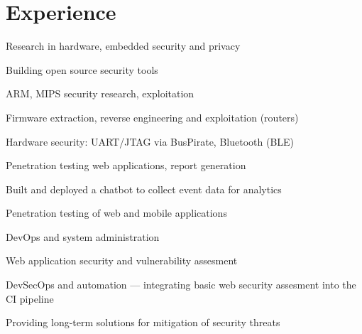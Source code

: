 \documentclass[]{resume-openfont}
\begin{document}
\hfill
\begin{minipage}[t]{0.66\textwidth} 


\section{Experience}
\vspace{\topsep} %
\begin{tightemize}
\item Research in hardware, embedded security and privacy
\item Building open source security tools
\end{tightemize}
\sectionsep

\begin{tightemize}
\item ARM, MIPS security research, exploitation
\item Firmware extraction, reverse engineering and exploitation (routers)
\item Hardware security: UART/JTAG via BusPirate, Bluetooth (BLE)
\end{tightemize}
\sectionsep

\begin{tightemize}
\item Penetration testing web applications, report generation
\item Built and deployed a chatbot to collect event data for analytics
\end{tightemize}
\sectionsep

\begin{tightemize}
\item Penetration testing of web and mobile applications
\item DevOps and system administration
\end{tightemize}
\sectionsep

\begin{tightemize}
\item Web application security and vulnerability assesment
\item DevSecOps and automation — integrating basic web security assesment into the CI pipeline
\item Providing long-term solutions for mitigation of security threats
\end{tightemize}
\sectionsep


\end{minipage}
\end{document}

